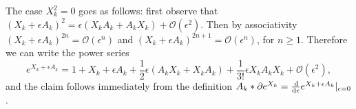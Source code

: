\documentclass[a4paper,12pt]{article}
\theoremstyle{definition}
\begin{document}
The case $X_k^2 = 0$ goes as follows: first observe that $(X_k + \epsilon A_k)^2 = \epsilon (X_k A_k + A_k X_k) + \mathcal{O}(\epsilon^2)$.
Then by associativity $(X_k + \epsilon A_k)^{2n} = \mathcal{O}(\epsilon^n)$ and $(X_k + \epsilon A_k)^{2n + 1} = \mathcal{O}(\epsilon^n)$, for $n \geq 1$.
Therefore we can write the power series
\begin{equation*}
 e^{X_k + \epsilon A_k} = 1 + X_k + \epsilon A_k + \frac{1}{2} \epsilon (A_k X_k + X_k A_k) + \frac{1}{3!} \epsilon X_k A_k X_k + \mathcal{O}(\epsilon^2),
\end{equation*}
and the claim follows immediately from the definition $A_k * \partial e^{X_k} = \frac{\dif}{\dif \epsilon} e^{X_k + \epsilon A_k} \vert_{\epsilon = 0}$.

\printbibliography[heading=bibintoc, title={References}]
\end{document}
